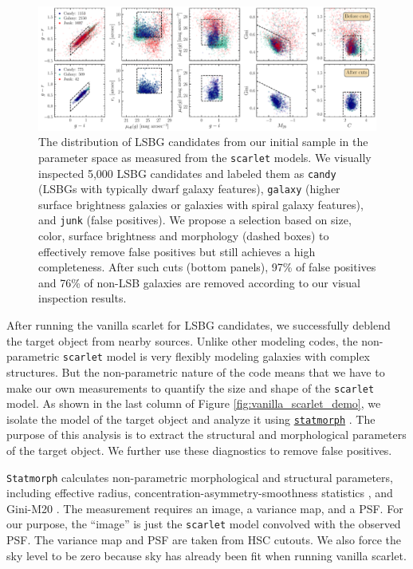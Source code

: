 \documentclass[twocolumn,astrosymb,twocolappendix]{aastex631}
\newcommand{\code}[1]{\texttt{#1}}
\begin{document}
\begin{CJK*}{UTF8}{gbsn}
\begin{figure}
	\vbox{
		\centering
		\includegraphics[width=1.0\linewidth]{deblending_cuts.pdf}
	}
	\caption{The distribution of LSBG candidates from our initial sample in the parameter space as measured from the \code{scarlet} models. We visually inspected 5,000 LSBG candidates and labeled them as \code{candy} (LSBGs with typically dwarf galaxy features), \code{galaxy} (higher surface brightness galaxies or galaxies with spiral galaxy features), and \code{junk} (false positives). We propose a selection based on size, color, surface brightness and morphology (dashed boxes) to effectively remove false positives but still achieves a high completeness. After such cuts (bottom panels), 97\% of false positives and 76\% of non-LSB galaxies are removed according to our visual inspection results. 
	}
	\label{fig:deblending_cuts}
\end{figure}

After running the vanilla scarlet for LSBG candidates, we successfully deblend the target object from nearby sources. Unlike other modeling codes, the non-parametric \code{scarlet} model is very flexibly modeling galaxies with complex structures. But the non-parametric nature of the code means that we have to make our own measurements to quantify the size and shape of the \code{scarlet} model. As shown in the last column of Figure \ref{fig:vanilla_scarlet_demo}, we isolate the model of the target object and analyze it using \href{https://statmorph.readthedocs.io/en/latest/}{\code{statmorph}} \citep{statmorph}. The purpose of this analysis is to extract the structural and morphological parameters of the target object. We further use these diagnostics to remove false positives. 

\code{Statmorph} calculates non-parametric morphological and structural parameters, including effective radius, concentration-asymmetry-smoothness statistics \citep[CAS,][]{Conselice2003}, and Gini-M20 \citep{Abraham2003,Lotz2004}. The measurement requires an image, a variance map, and a PSF. For our purpose, the ``image'' is just the \code{scarlet} model convolved with the observed PSF. The variance map and PSF are taken from HSC cutouts. We also force the sky level to be zero because sky has already been fit when running vanilla scarlet. 


\end{CJK*}
\end{document}
